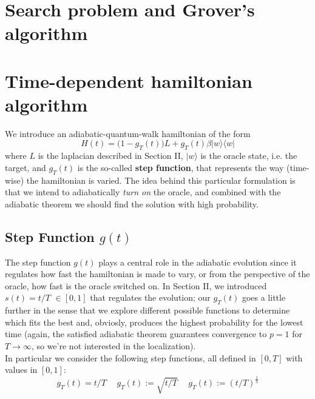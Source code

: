 \documentclass[aps,pra,reprint, onecolumn]{revtex4-2}
\begin{document}
\section{Search problem and Grover's algorithm}


\section{Time-dependent hamiltonian algorithm}

We introduce an adiabatic-quantum-walk hamiltonian of the form
\begin{equation}
    H(t) = \big( 1-g_T(t)\big)L + g_T(t)\beta|w\rangle\langle w|
\end{equation}
where $L$ is the laplacian described in Section II, $|w\rangle$ is the oracle state, i.e. the target, and $g_T(t)$ is the so-called \textbf{step function}, that represents the way (time-wise) the hamiltonian is varied.
The idea behind this particular formulation is that we intend to adiabatically \textit{turn on} the oracle, and combined with the adiabatic theorem we should find the solution with high probability.

\subsection{Step Function $g(t)$}
The step function $g(t)$ plays a central role in the adiabatic evolution since it regulates how fast the hamiltonian is made to vary, or from the perspective of the oracle, how fast is the oracle switched on. In Section II, we introduced $s(t) = t/T$ $\in [0,1]$ that regulates the evolution; our $g_T(t)$ goes a little further in the sense that we explore different possible functions to determine which fits the best and, obviosly, produces the highest probability for the lowest time (again, the satisfied adiabatic theorem guarantees convergence to $p=1$ for $T\to\infty$, so we're not interested in the localization).\\

In particular we consider the following step functions, all defined in $[0,T]$ with values in $[0,1]$:
\begin{equation}
    g_T(t) = t/T \hspace{15pt} g_T(t) := \sqrt{t/T} \hspace{15pt} g_T(t) := (t/T)^{\frac{1}{3}}
\end{equation}
\end{document}

